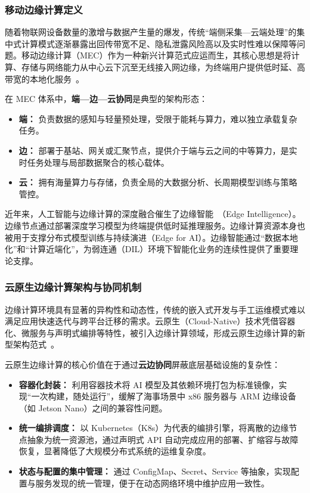 \subsubsection{移动边缘计算定义}
随着物联网设备数量的激增与数据产生量的爆发，传统“端侧采集—云端处理”的集中式计算模式逐渐暴露出回传带宽不足、隐私泄露风险高以及实时性难以保障等问题。移动边缘计算（MEC）作为一种新兴计算范式应运而生，其核心思想是将计算、存储与网络能力从中心云下沉至无线接入网边缘，为终端用户提供低时延、高带宽的本地化服务~。

在 MEC 体系中，\textbf{端—边—云协同}是典型的架构形态：
\begin{itemize}
	\item \textbf{端：} 负责数据的感知与轻量预处理，受限于能耗与算力，难以独立承载复杂任务。
	\item \textbf{边：} 部署于基站、网关或汇聚节点，提供介于端与云之间的中等算力，是实时任务处理与局部数据聚合的核心载体。
	\item \textbf{云：} 拥有海量算力与存储，负责全局的大数据分析、长周期模型训练与策略管控。
\end{itemize}

近年来，人工智能与边缘计算的深度融合催生了边缘智能~（Edge Intelligence）。边缘节点通过部署深度学习模型为终端提供低时延推理服务。边缘计算资源本身也被用于支撑分布式模型训练与持续演进（Edge for AI）。边缘智能通过“数据本地化”和“计算近端化”，为弱连通（DIL）环境下智能化业务的连续性提供了重要理论支撑。

\subsubsection{云原生边缘计算架构与协同机制}
边缘计算环境具有显著的异构性和动态性，传统的嵌入式开发与手工运维模式难以满足应用快速迭代与跨平台迁移的需求。云原生（Cloud-Native）技术凭借容器化、微服务与声明式编排等特性，被引入边缘计算领域，形成云原生边缘计算的新型架构范式~。

云原生边缘计算的核心价值在于通过\textbf{云边协同}屏蔽底层基础设施的复杂性：
\begin{itemize}
	\item \textbf{容器化封装：} 利用容器技术将 AI 模型及其依赖环境打包为标准镜像，实现“一次构建，随处运行”，缓解了海事场景中 x86 服务器与 ARM 边缘设备（如 Jetson Nano）之间的兼容性问题。
	\item \textbf{统一编排调度：} 以 Kubernetes（K8s）为代表的编排引擎，将离散的边缘节点抽象为统一资源池，通过声明式 API 自动完成应用的部署、扩缩容与故障恢复，显著降低了大规模分布式系统的运维复杂度。
	\item \textbf{状态与配置的集中管理：} 通过 ConfigMap、Secret、Service 等抽象，实现配置与服务发现的统一管理，便于在动态网络环境中维护应用一致性。
\end{itemize}

